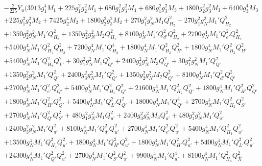 {\begin{align}
 &-\frac{2}{225} Y_u \Big(3913 g_{1}^{4} M_1 +225 g_{1}^{2} g_{2}^{2} M_1 +680 g_{1}^{2} g_{3}^{2} M_1 +680 g_{1}^{2} g_{3}^{2} M_3 +1800 g_{2}^{2} g_{3}^{2} M_3 +6400 g_{3}^{4} M_3 \nonumber \\ 
 &+225 g_{1}^{2} g_{2}^{2} M_2 +7425 g_{2}^{4} M_2 +1800 g_{2}^{2} g_{3}^{2} M_2 +270 g_{1}^{2} g_{N}^{2} M_1 Q_{H_2}^{2} +270 g_{1}^{2} g_{N}^{2} M_1' Q_{H_2}^{2} \nonumber \\ 
 &+1350 g_{2}^{2} g_{N}^{2} M_1' Q_{H_2}^{2} +1350 g_{2}^{2} g_{N}^{2} M_2 Q_{H_2}^{2} +8100 g_{N}^{4} M_1' Q_{d'}^{2} Q_{H_2}^{2} +2700 g_{N}^{4} M_1' Q_{e'}^{2} Q_{H_2}^{2} \nonumber \\ 
 &+5400 g_{N}^{4} M_1' Q_{H_1}^{2} Q_{H_2}^{2} +7200 g_{N}^{4} M_1' Q_{H_2}^{4} +1800 g_{N}^{4} M_1' Q_{H_2}^{2} Q_{\bar{H}'}^{2} +1800 g_{N}^{4} M_1' Q_{H_2}^{2} Q_{H'}^{2} \nonumber \\ 
 &+5400 g_{N}^{4} M_1' Q_{H_2}^{2} Q_{L'}^{2} +30 g_{1}^{2} g_{N}^{2} M_1 Q_{Q'}^{2} +2400 g_{3}^{2} g_{N}^{2} M_3 Q_{Q'}^{2} +30 g_{1}^{2} g_{N}^{2} M_1' Q_{Q'}^{2} \nonumber \\ 
 &+1350 g_{2}^{2} g_{N}^{2} M_1' Q_{Q'}^{2} +2400 g_{3}^{2} g_{N}^{2} M_1' Q_{Q'}^{2} +1350 g_{2}^{2} g_{N}^{2} M_2 Q_{Q'}^{2} +8100 g_{N}^{4} M_1' Q_{d'}^{2} Q_{Q'}^{2} \nonumber \\ 
 &+2700 g_{N}^{4} M_1' Q_{e'}^{2} Q_{Q'}^{2} +5400 g_{N}^{4} M_1' Q_{H_1}^{2} Q_{Q'}^{2} +21600 g_{N}^{4} M_1' Q_{H_2}^{2} Q_{Q'}^{2} +1800 g_{N}^{4} M_1' Q_{\bar{H}'}^{2} Q_{Q'}^{2} \nonumber \\ 
 &+1800 g_{N}^{4} M_1' Q_{H'}^{2} Q_{Q'}^{2} +5400 g_{N}^{4} M_1' Q_{L'}^{2} Q_{Q'}^{2} +18000 g_{N}^{4} M_1' Q_{Q'}^{4} +2700 g_{N}^{4} M_1' Q_{H_2}^{2} Q_{S'}^{2} \nonumber \\ 
 &+2700 g_{N}^{4} M_1' Q_{Q'}^{2} Q_{S'}^{2} +480 g_{1}^{2} g_{N}^{2} M_1 Q_{u'}^{2} +2400 g_{3}^{2} g_{N}^{2} M_3 Q_{u'}^{2} +480 g_{1}^{2} g_{N}^{2} M_1' Q_{u'}^{2} \nonumber \\ 
 &+2400 g_{3}^{2} g_{N}^{2} M_1' Q_{u'}^{2} +8100 g_{N}^{4} M_1' Q_{d'}^{2} Q_{u'}^{2} +2700 g_{N}^{4} M_1' Q_{e'}^{2} Q_{u'}^{2} +5400 g_{N}^{4} M_1' Q_{H_1}^{2} Q_{u'}^{2} \nonumber \\ 
 &+13500 g_{N}^{4} M_1' Q_{H_2}^{2} Q_{u'}^{2} +1800 g_{N}^{4} M_1' Q_{\bar{H}'}^{2} Q_{u'}^{2} +1800 g_{N}^{4} M_1' Q_{H'}^{2} Q_{u'}^{2} +5400 g_{N}^{4} M_1' Q_{L'}^{2} Q_{u'}^{2} \nonumber \\ 
 &+24300 g_{N}^{4} M_1' Q_{Q'}^{2} Q_{u'}^{2} +2700 g_{N}^{4} M_1' Q_{S'}^{2} Q_{u'}^{2} +9900 g_{N}^{4} M_1' Q_{u'}^{4} +8100 g_{N}^{4} M_1' Q_{H_2}^{2} Q_{\bar{X}}^{2} \nonumber \\ 

\end{align}}
